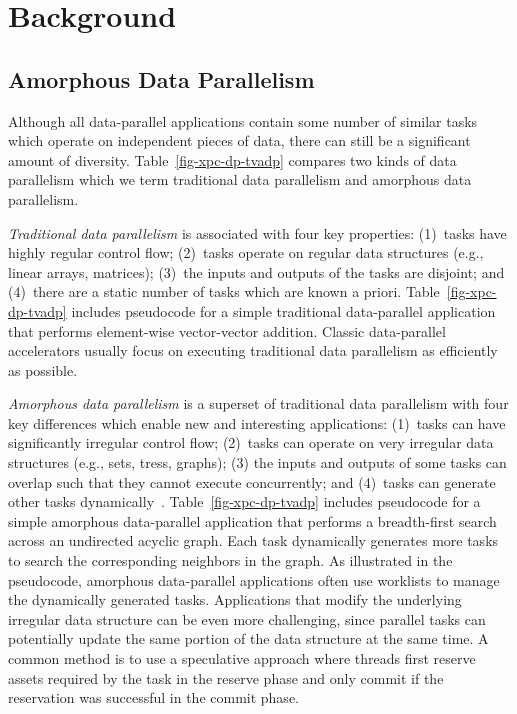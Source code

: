 
\section{Background}
\label{sec-background}

\subsection{Amorphous Data Parallelism}

Although all data-parallel applications contain some number of similar
tasks which operate on independent pieces of data, there can still be a
significant amount of diversity. Table~\ref{fig-xpc-dp-tvadp} compares
two kinds of data parallelism which we term traditional data parallelism
and amorphous data parallelism.

\emph{Traditional data parallelism} is associated with four key
properties: (1)~tasks have highly regular control flow; (2)~tasks operate
on regular data structures (e.g., linear arrays, matrices); (3)~the
inputs and outputs of the tasks are disjoint; and (4)~there are a static
number of tasks which are known a priori. Table~\ref{fig-xpc-dp-tvadp}
includes pseudocode for a simple traditional data-parallel application
that performs element-wise vector-vector addition. Classic data-parallel
accelerators usually focus on executing traditional data parallelism as
efficiently as possible.

\emph{Amorphous data parallelism} is a superset of traditional data
parallelism with four key differences which enable new and interesting
applications: (1)~tasks can have significantly irregular control flow;
(2)~tasks can operate on very irregular data structures (e.g., sets,
tress, graphs); (3) the inputs and outputs of some tasks can overlap such
that they cannot execute concurrently; and (4)~tasks can generate other
tasks dynamically~\cite{pingali-tao-pldi2011}.
Table~\ref{fig-xpc-dp-tvadp} includes pseudocode for a simple amorphous
data-parallel application that performs a breadth-first search across an
undirected acyclic graph. Each task dynamically generates more tasks to
search the corresponding neighbors in the graph. As illustrated in the
pseudocode, amorphous data-parallel applications often use worklists to
manage the dynamically generated tasks. Applications that modify the
underlying irregular data structure can be even more challenging, since
parallel tasks can potentially update the same portion of the data
structure at the same time. A common method is to use a speculative
approach where threads first reserve assets required by the task in the
reserve phase and only commit if the reservation was successful in the
commit phase.
